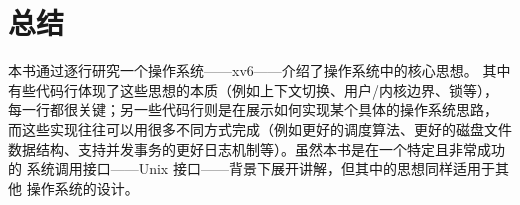 \chapter{总结}
\label{CH:SUM}

本书通过逐行研究一个操作系统——xv6——介绍了操作系统中的核心思想。
其中有些代码行体现了这些思想的本质（例如上下文切换、用户/内核边界、锁等），
每一行都很关键；另一些代码行则是在展示如何实现某个具体的操作系统思路，
而这些实现往往可以用很多不同方式完成（例如更好的调度算法、更好的磁盘文件
数据结构、支持并发事务的更好日志机制等）。虽然本书是在一个特定且非常成功的
系统调用接口——Unix 接口——背景下展开讲解，但其中的思想同样适用于其他
操作系统的设计。
